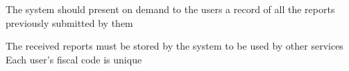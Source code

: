 \textbf{}

\begin{itemize}

\require The system should present on demand to the users a record of all the reports previously submitted by them
\end{itemize}

\begin{itemize}
\domain The received reports must be stored by the system to be used by other services
\domain Each user’s fiscal code is unique

\end{itemize}

